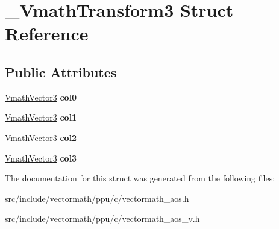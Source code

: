 \hypertarget{struct__VmathTransform3}{\section{\-\_\-\-Vmath\-Transform3 Struct Reference}
\label{struct__VmathTransform3}
}
\subsection*{Public Attributes}
\begin{DoxyCompactItemize}
\item 
\hypertarget{struct__VmathTransform3_aab2388ec1b5c7a885b114ff98a533f08}{\hyperlink{struct__VmathVector3}{Vmath\-Vector3} {\bfseries col0}}\label{struct__VmathTransform3_aab2388ec1b5c7a885b114ff98a533f08}

\item 
\hypertarget{struct__VmathTransform3_a8af681279d6982b5dc5da4058b949221}{\hyperlink{struct__VmathVector3}{Vmath\-Vector3} {\bfseries col1}}\label{struct__VmathTransform3_a8af681279d6982b5dc5da4058b949221}

\item 
\hypertarget{struct__VmathTransform3_addf9e7433ed82e21fb7358b6662640f5}{\hyperlink{struct__VmathVector3}{Vmath\-Vector3} {\bfseries col2}}\label{struct__VmathTransform3_addf9e7433ed82e21fb7358b6662640f5}

\item 
\hypertarget{struct__VmathTransform3_ad92974b79c3767a9c1f1f47415cc6610}{\hyperlink{struct__VmathVector3}{Vmath\-Vector3} {\bfseries col3}}\label{struct__VmathTransform3_ad92974b79c3767a9c1f1f47415cc6610}

\end{DoxyCompactItemize}


The documentation for this struct was generated from the following files\-:\begin{DoxyCompactItemize}
\item 
src/include/vectormath/ppu/c/vectormath\-\_\-aos.\-h\item 
src/include/vectormath/ppu/c/vectormath\-\_\-aos\-\_\-v.\-h\end{DoxyCompactItemize}
